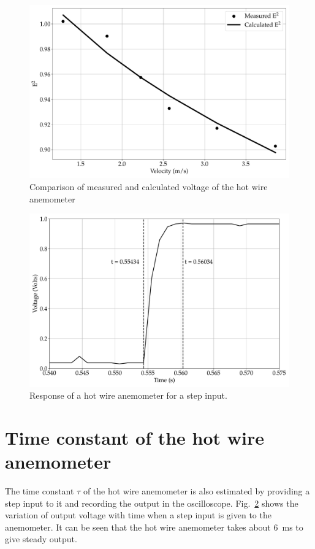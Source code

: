 \begin{figure}[ht]
    \centering
    \includegraphics[width=\linewidth]{gfx/calibration_of_hot_wire.pdf}
    \caption{Comparison of measured and calculated voltage of the hot wire anemometer}
    \label{fig:calibration_of_hwa}
\end{figure}
\begin{figure}[H]
    \centering
    \includegraphics[width=\linewidth]{gfx/Time_constant_hot_wire.pdf}
    \caption{Response of a hot wire anemometer for a step input.}
    \label{fig:time_hotwire}
\end{figure}
\section{Time constant of the hot wire anemometer}
The time constant $\tau$ of the hot wire anemometer is also estimated by providing a step input to it and recording the output in the oscilloscope. Fig.~\ref{fig:time_hotwire} shows the variation of output voltage with time when a step input is given to the anemometer. It can be seen that the hot wire anemometer takes about 6~ms to give steady output.



